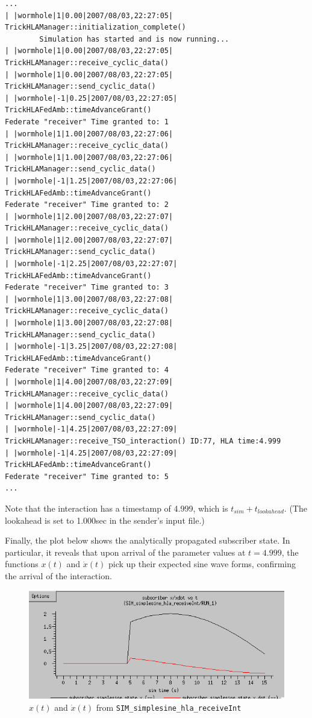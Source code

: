 \begin{lstlisting}[numbers=none,caption={{\em receiver} output showing interaction at $t=4$}]
...
| |wormhole|1|0.00|2007/08/03,22:27:05| TrickHLAManager::initialization_complete()
        Simulation has started and is now running...
| |wormhole|1|0.00|2007/08/03,22:27:05| TrickHLAManager::receive_cyclic_data()
| |wormhole|1|0.00|2007/08/03,22:27:05| TrickHLAManager::send_cyclic_data()
| |wormhole|-1|0.25|2007/08/03,22:27:05| TrickHLAFedAmb::timeAdvanceGrant()
Federate "receiver" Time granted to: 1
| |wormhole|1|1.00|2007/08/03,22:27:06| TrickHLAManager::receive_cyclic_data()
| |wormhole|1|1.00|2007/08/03,22:27:06| TrickHLAManager::send_cyclic_data()
| |wormhole|-1|1.25|2007/08/03,22:27:06| TrickHLAFedAmb::timeAdvanceGrant()
Federate "receiver" Time granted to: 2
| |wormhole|1|2.00|2007/08/03,22:27:07| TrickHLAManager::receive_cyclic_data()
| |wormhole|1|2.00|2007/08/03,22:27:07| TrickHLAManager::send_cyclic_data()
| |wormhole|-1|2.25|2007/08/03,22:27:07| TrickHLAFedAmb::timeAdvanceGrant()
Federate "receiver" Time granted to: 3
| |wormhole|1|3.00|2007/08/03,22:27:08| TrickHLAManager::receive_cyclic_data()
| |wormhole|1|3.00|2007/08/03,22:27:08| TrickHLAManager::send_cyclic_data()
| |wormhole|-1|3.25|2007/08/03,22:27:08| TrickHLAFedAmb::timeAdvanceGrant()
Federate "receiver" Time granted to: 4
| |wormhole|1|4.00|2007/08/03,22:27:09| TrickHLAManager::receive_cyclic_data()
| |wormhole|1|4.00|2007/08/03,22:27:09| TrickHLAManager::send_cyclic_data()
| |wormhole|-1|4.25|2007/08/03,22:27:09| TrickHLAManager::receive_TSO_interaction() ID:77, HLA time:4.999
| |wormhole|-1|4.25|2007/08/03,22:27:09| TrickHLAFedAmb::timeAdvanceGrant()
Federate "receiver" Time granted to: 5
...
\end{lstlisting}

Note that the interaction has a timestamp of 4.999, which is
$t_{sim} + t_{lookahead}$.
(The lookahead is set to 1.000sec in the sender's input file.)

Finally, the plot below shows the analytically propagated subscriber state.
In particular, it reveals that upon arrival of the parameter values
at $t=4.999$, the functions $x(t)$ and $\dot{x}(t)$ pick up their expected
sine wave forms, confirming the arrival of the interaction.

\begin{figure}[h]
  \begin{center}
    \includegraphics[width=4.5in]{TrickHLAUser-receiveInt.png}
  \end{center}
\caption{$x(t)$ and $\dot{x}(t)$ from {\tt SIM\_simplesine\_hla\_receiveInt}}
\label{fig:hla-receiveInt}
\end{figure}
